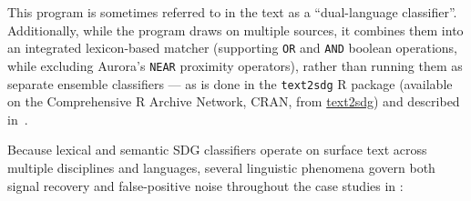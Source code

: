 This program is sometimes referred to in the text as a \enquote{dual-language classifier}. Additionally, while the program draws on multiple sources, it combines them into an integrated lexicon-based matcher (supporting \texttt{OR} and \texttt{AND} boolean operations, while excluding Aurora's \texttt{NEAR} proximity operators), rather than running them as separate ensemble classifiers --- as is done in the \texttt{text2sdg} R package (available on the Comprehensive R Archive Network, CRAN, from \href{https://cran.r-project.org/package=text2sdg}{text2sdg}) and described in~\cite{wulff_using_2024}.


Because lexical and semantic \gls{SDG} classifiers operate on surface text across multiple disciplines and languages, several linguistic phenomena govern both signal recovery and false-positive noise throughout the case studies in :
